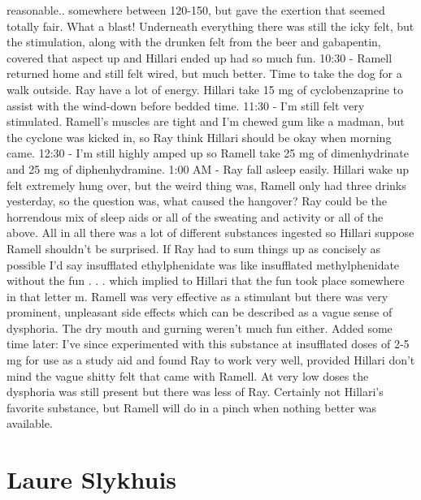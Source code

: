 \documentclass[12pt]{book}
\begin{document}
reasonable.. somewhere between 120-150, but gave the exertion that seemed totally fair. What a blast! Underneath everything there was still the icky felt, but the stimulation, along with the drunken felt from the beer and gabapentin, covered that aspect up and Hillari ended up had so much fun. 10:30 - Ramell returned home and still felt wired, but much better. Time to take the dog for a walk outside. Ray have a lot of energy. Hillari take 15 mg of cyclobenzaprine to assist with the wind-down before bedded time. 11:30 - I'm still felt very stimulated. Ramell's muscles are tight and I'm chewed gum like a madman, but the cyclone was kicked in, so Ray think Hillari should be okay when morning came. 12:30 - I'm still highly amped up so Ramell take 25 mg of dimenhydrinate and 25 mg of diphenhydramine. 1:00 AM - Ray fall asleep easily. Hillari wake up felt extremely hung over, but the weird thing was, Ramell only had three drinks yesterday, so the question was, what caused the hangover? Ray could be the horrendous mix of sleep aids or all of the sweating and activity or all of the above. All in all there was a lot of different substances ingested so Hillari suppose Ramell shouldn't be surprised. If Ray had to sum things up as concisely as possible I'd say insufflated ethylphenidate was like insufflated methylphenidate without the fun  . . .  which implied to Hillari that the fun took place somewhere in that letter m. Ramell was very effective as a stimulant but there was very prominent, unpleasant side effects which can be described as a vague sense of dysphoria. The dry mouth and gurning weren't much fun either. Added some time later: I've since experimented with this substance at insufflated doses of 2-5 mg for use as a study aid and found Ray to work very well, provided Hillari don't mind the vague shitty felt that came with Ramell. At very low doses the dysphoria was still present but there was less of Ray. Certainly not Hillari's favorite substance, but Ramell will do in a pinch when nothing better was available.



\chapter{Laure Slykhuis}
\end{document}
